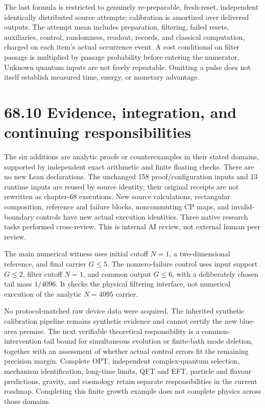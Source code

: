 \documentclass[
  11pt,
  oneside]{book}
\begin{document}
The last formula is restricted to genuinely re-preparable, fresh-reset,
independent identically distributed source attempts; calibration is
amortized over delivered outputs. The attempt mean includes preparation,
filtering, failed resets, auxiliaries, control, randomness, readout,
records, and classical computation, charged on each item's actual
occurrence event. A cost conditional on filter passage is multiplied by
passage probability before entering the numerator. Unknown quantum
inputs are not freely repeatable. Omitting a pulse does not itself
establish measured time, energy, or monetary advantage.

\section{68.10 Evidence, integration, and continuing responsibilities}

The six additions are analytic proofs or counterexamples in their stated
domains, supported by independent exact arithmetic and finite floating
checks. There are no new Lean declarations. The unchanged 158
proof/configuration inputs and 13 runtime inputs are reused by source
identity; their original receipts are not rewritten as chapter-68
executions. New source calculations, rectangular composition, reference
and failure blocks, noncommuting CP maps, and invalid-boundary controls
have new actual execution identities. Three native research tasks
performed cross-review. This is internal AI review, not external human
peer review.

The main numerical witness uses initial cutoff \(N=1\), a
two-dimensional reference, and final carrier \(G\le5\). The
nonzero-failure control uses input support \(G\le2\), filter cutoff
\(N=1\), and common output \(G\le6\), with a deliberately chosen tail
mass \(1/4096\). It checks the physical filtering interface, not
numerical execution of the analytic \(N=4095\) carrier.

No protocol-matched raw device data were acquired. The inherited
synthetic calibration pipeline remains synthetic evidence and cannot
certify the new blue-area premise. The next verifiable theoretical
responsibility is a common-intervention tail bound for simultaneous
evolution or finite-bath mode deletion, together with an assessment of
whether actual control errors fit the remaining precision margin.
Complete OPT, independent complex-quantum selection, mechanism
identification, long-time limits, QFT and EFT, particle and flavour
predictions, gravity, and cosmology retain separate responsibilities in
the current roadmap. Completing this finite growth example does not
complete physics across those domains.
\end{document}
